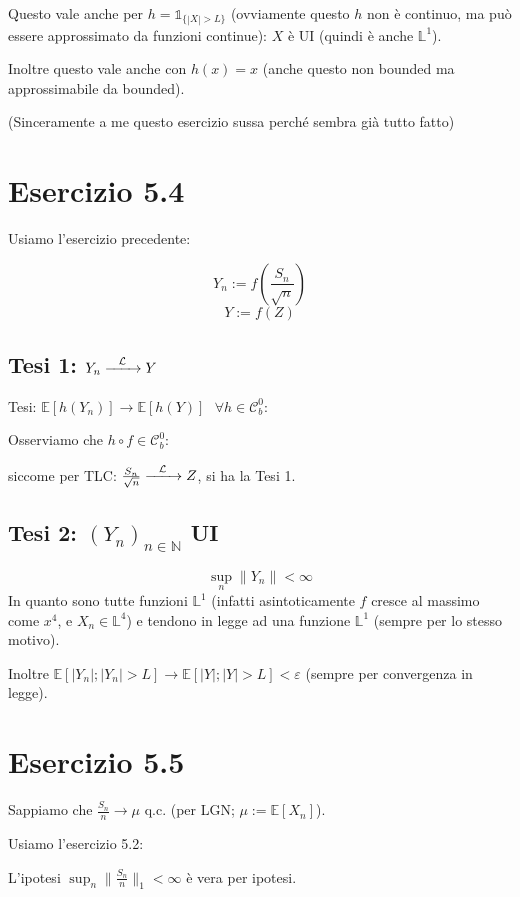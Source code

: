 \documentclass{article}
\newcommand{\myrightarrow}[1]{\xrightarrow{\makebox[2em][c]{$\scriptstyle#1$}}}
\newcommand{\convlegge}{\myrightarrow{\mathcal{L}}}
\begin{document}
Questo vale anche per $h = \mathds{1}_{\{|X|>L\}}$ (ovviamente questo $h$ non è continuo, ma può essere approssimato da funzioni continue): $X$ è UI (quindi è anche $\mathbb{L}^1$).

Inoltre questo vale anche con $h\left(x\right) =x$ (anche questo non bounded ma approssimabile da bounded).


(Sinceramente a me questo esercizio sussa perché sembra già tutto fatto)


\section{Esercizio 5.4}
Usiamo l'esercizio precedente:

\[Y_n := f\left(\frac{S_n}{\sqrt{n}}\right)\]
\[Y:=f(Z)\]

\subsection{Tesi 1: $Y_n \convlegge Y$}
Tesi: $\mathbb{E}\left[h\left(Y_n\right)\right] \rightarrow  \mathbb{E}\left[h\left(Y\right)\right]\ \ \ \forall h\in \mathcal{C}^0_b$:

Osserviamo che $h\circ f\in \mathcal{C}^0_b$:

siccome per TLC: $\frac{S_n}{\sqrt{n}} \convlegge Z$, si ha la Tesi 1.

\subsection{Tesi 2: $\left(Y_n\right)_{n\in \mathbb{N}}$ UI}
\[\sup_n \|Y_n\| < \infty \]
In quanto sono tutte funzioni $\mathbb{L}^1$ (infatti asintoticamente $f$ cresce al massimo come $x^4$, e $X_n\in \mathbb{L}^4$) e tendono in legge ad una funzione $\mathbb{L}^1$ (sempre per lo stesso motivo).

Inoltre $\mathbb{E}\left[|Y_n|; |Y_n|>L\right] \rightarrow  \mathbb{E}\left[|Y|;|Y|>L\right] < \varepsilon $ (sempre per convergenza in legge). 


\section{Esercizio 5.5}
Sappiamo che $\frac{S_n}{n} \longrightarrow \mu $ q.c. (per LGN; $\mu := \mathbb{E}[X_n]$).

Usiamo l'esercizio 5.2:

L'ipotesi $\sup_n \lVert\frac{S_n}{n}\rVert_1  < \infty $ è vera per ipotesi.
\end{document}
